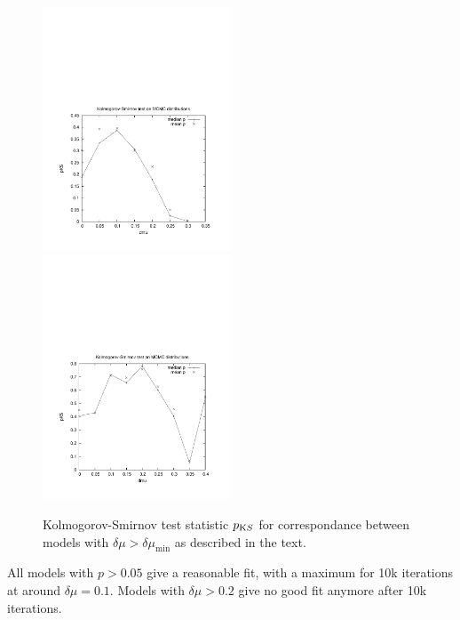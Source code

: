 \begin{figure}
    \begin{center} \hspace{-7mm}
        \includegraphics[width=0.5\textwidth]{fig/10kit.pdf}
        \includegraphics[width=0.5\textwidth]{fig/50kit.pdf}
        \caption{Kolmogorov-Smirnov test statistic $p_{\text KS}$ for
correspondance between models with $\delta\mu>\delta\mu_{\min}$ as
described in the text.}
        \label{fig:kit}
    \end{center}
\end{figure}
All models with $p>0.05$ give a reasonable fit, with a maximum for 10k
iterations at around $\delta \mu = 0.1$. Models with $\delta \mu>0.2$
give no good fit anymore after 10k iterations.

